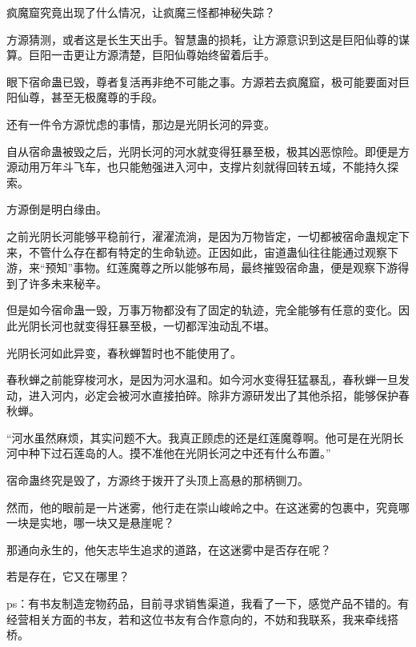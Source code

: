 \begin{this_body}
疯魔窟究竟出现了什么情况，让疯魔三怪都神秘失踪？

方源猜测，或者这是长生天出手。智慧蛊的损耗，让方源意识到这是巨阳仙尊的谋算。巨阳一击更让方源清楚，巨阳仙尊始终留着后手。

眼下宿命蛊已毁，尊者复活再非绝不可能之事。方源若去疯魔窟，极可能要面对巨阳仙尊，甚至无极魔尊的手段。

还有一件令方源忧虑的事情，那边是光阴长河的异变。

自从宿命蛊被毁之后，光阴长河的河水就变得狂暴至极，极其凶恶惊险。即便是方源动用万年斗飞车，也只能勉强进入河中，支撑片刻就得回转五域，不能持久探索。

方源倒是明白缘由。

之前光阴长河能够平稳前行，濯濯流淌，是因为万物皆定，一切都被宿命蛊规定下来，不管什么存在都有特定的生命轨迹。正因如此，宙道蛊仙往往能通过观察下游，来“预知”事物。红莲魔尊之所以能够布局，最终摧毁宿命蛊，便是观察下游得到了许多未来秘辛。

但是如今宿命蛊一毁，万事万物都没有了固定的轨迹，完全能够有任意的变化。因此光阴长河也就变得狂暴至极，一切都浑浊动乱不堪。

光阴长河如此异变，春秋蝉暂时也不能使用了。

春秋蝉之前能穿梭河水，是因为河水温和。如今河水变得狂猛暴乱，春秋蝉一旦发动，进入河内，必定会被河水直接拍碎。除非方源研发出了其他杀招，能够保护春秋蝉。

“河水虽然麻烦，其实问题不大。我真正顾虑的还是红莲魔尊啊。他可是在光阴长河中种下过石莲岛的人。摸不准他在光阴长河之中还有什么布置。”

宿命蛊终究是毁了，方源终于拨开了头顶上高悬的那柄铡刀。

然而，他的眼前是一片迷雾，他行走在崇山峻岭之中。在这迷雾的包裹中，究竟哪一块是实地，哪一块又是悬崖呢？

那通向永生的，他矢志毕生追求的道路，在这迷雾中是否存在呢？

若是存在，它又在哪里？

ps：有书友制造宠物药品，目前寻求销售渠道，我看了一下，感觉产品不错的。有经营相关方面的书友，若和这位书友有合作意向的，不妨和我联系，我来牵线搭桥。

\end{this_body}

